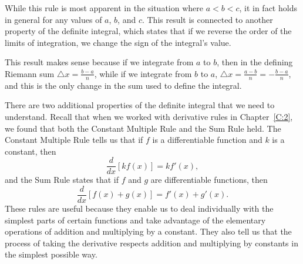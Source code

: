   
\vspace*{5pt}
\noindent {}
\vspace*{1pt}

\noindent While this rule is most apparent in the situation where $a < b < c$, it in fact holds in general for any values of $a$, $b$, and $c$.  This result is connected to another property of the definite integral, which states that if we reverse the order of the limits of integration, we change the sign of the integral's value.

\vspace*{5pt}
\noindent {}
\vspace*{1pt}

\noindent This result makes sense because if we integrate from $a$ to $b$, then in the defining Riemann sum $\triangle x = \frac{b-a}{n}$, while if we integrate from $b$ to $a$, $\triangle x = \frac{a-b}{n} = -\frac{b-a}{n}$, and this is the only change in the sum used to define the integral.

There are two additional properties of the definite integral that we need to understand.  Recall that when we worked with derivative rules in Chapter~\ref{C:2}, we found that both the Constant Multiple Rule and the Sum Rule held.  The Constant Multiple Rule tells us that if $f$ is a differentiable function and $k$ is a constant, then
$$\frac{d}{dx} [kf(x)] = kf'(x),$$
and the Sum Rule states that if $f$ and $g$ are differentiable functions, then
$$\frac{d}{dx}[f(x) + g(x)] = f'(x) + g'(x).$$
These rules are useful because they enable us to deal individually with the simplest parts of certain functions and take advantage of the elementary operations of addition and multiplying by a constant.  They also tell us that the process of taking the derivative respects addition and multiplying by constants in the simplest possible way.  

